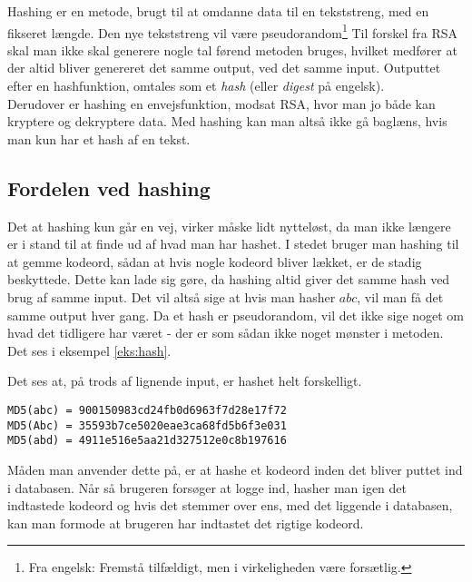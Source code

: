 Hashing er en metode, brugt til at omdanne data til en tekststreng, med en fikseret længde.
Den nye tekststreng vil være pseudorandom\footnote{Fra engelsk: Fremstå tilfældigt, men i virkeligheden være forsætlig.} %
Til forskel fra RSA skal man ikke skal generere nogle tal førend metoden bruges, hvilket medfører at der altid bliver genereret det samme output, ved det samme input.
Outputtet efter en hashfunktion, omtales som et \emph{hash} (eller \emph{digest} på engelsk).
\\
Derudover er hashing en envejsfunktion, modsat RSA, hvor man jo både kan kryptere og dekryptere data.
Med hashing kan man altså ikke gå baglæns, hvis man kun har et hash af en tekst.\cite{algoritmer}


\subsection{Fordelen ved hashing}
Det at hashing kun går en vej, virker måske lidt nytteløst, da man ikke længere er i stand til at finde ud af hvad man har hashet.
I stedet bruger man hashing til at gemme kodeord, sådan at hvis nogle kodeord bliver lækket, er de stadig beskyttede.
Dette kan lade sig gøre, da hashing altid giver det samme hash ved brug af samme input.
Det vil altså sige at hvis man hasher \(abc\), vil man få det samme output hver gang.
Da et hash er pseudorandom, vil det ikke sige noget om hvad det tidligere har været - der er som sådan ikke noget mønster i metoden.
Det ses i eksempel \ref{eks:hash}.

\begin{eks}
    \label{eks:hash}
    Det ses at, på trods af lignende input, er hashet helt forskelligt.
    \begin{center}
        \texttt{MD5(abc) = 900150983cd24fb0d6963f7d28e17f72}\\
        \texttt{MD5(Abc) = 35593b7ce5020eae3ca68fd5b6f3e031}\\
        \texttt{MD5(abd) = 4911e516e5aa21d327512e0c8b197616}\\
    \end{center}
\end{eks}

\noindent
Måden man anvender dette på, er at hashe et kodeord inden det bliver puttet ind i databasen.
Når så brugeren forsøger at logge ind, hasher man igen det indtastede kodeord og hvis det stemmer over ens, med det liggende i databasen, kan man formode at brugeren har indtastet det rigtige kodeord.
\\

